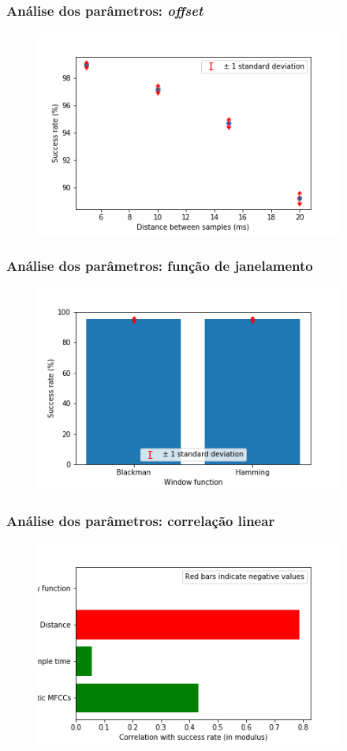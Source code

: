 \documentclass{beamer}
\begin{document}
\begin{frame}
    \frametitle{Análise dos parâmetros: \emph{offset}}

    \begin{figure}[]
        \centering
        \includegraphics[height=192pt]{Figure_3.png}
    \end{figure}

\end{frame}
\begin{frame}
    \frametitle{Análise dos parâmetros: função de janelamento}

    \begin{figure}[]
        \centering
        \includegraphics[height=192pt]{Figure_4.png}
    \end{figure}

\end{frame}
\begin{frame}
    \frametitle{Análise dos parâmetros: correlação linear}

    \begin{figure}[]
        \centering
        \includegraphics[height=192pt]{Figure_5.png}
    \end{figure}

\end{frame}
\end{document}
